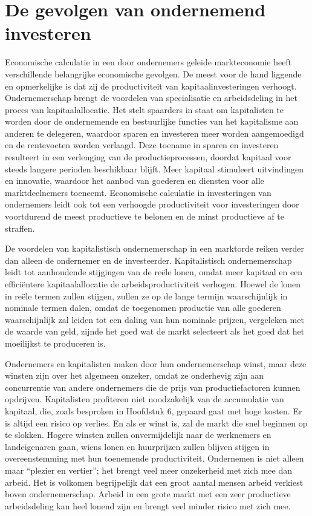 \hypertarget{de-gevolgen-van-ondernemend-investeren}{%
\section{De gevolgen van ondernemend investeren}\label{de-gevolgen-van-ondernemend-investeren}}

Economische calculatie in een door ondernemers geleide markteconomie heeft verschillende belangrijke economische gevolgen. De meest voor de hand liggende en opmerkelijke is dat zij de productiviteit van kapitaalinvesteringen verhoogt. Ondernemerschap brengt de voordelen van specialisatie en arbeidsdeling in het proces van kapitaalallocatie. Het stelt spaarders in staat om kapitalisten te worden door de ondernemende en bestuurlijke functies van het kapitalisme aan anderen te delegeren, waardoor sparen en investeren meer worden aangemoedigd en de rentevoeten worden verlaagd. Deze toename in sparen en investeren resulteert in een verlenging van de productieprocessen, doordat kapitaal voor steeds langere perioden beschikbaar blijft. Meer kapitaal stimuleert uitvindingen en innovatie, waardoor het aanbod van goederen en diensten voor alle marktdeelnemers toeneemt. Economische calculatie in investeringen van ondernemers leidt ook tot een verhoogde productiviteit voor investeringen door voortdurend de meest productieve te belonen en de minst productieve af te straffen.

De voordelen van kapitalistisch ondernemerschap in een marktorde reiken verder dan alleen de ondernemer en de investeerder. Kapitalistisch ondernemerschap leidt tot aanhoudende stijgingen van de reële lonen, omdat meer kapitaal en een efficiëntere kapitaalallocatie de arbeidsproductiviteit verhogen. Hoewel de lonen in reële termen zullen stijgen, zullen ze op de lange termijn waarschijnlijk in nominale termen dalen, omdat de toegenomen productie van alle goederen waarschijnlijk zal leiden tot een daling van hun nominale prijzen, vergeleken met de waarde van geld, zijnde het goed wat de markt selecteert als het goed dat het moeilijkst te produceren is.

Ondernemers en kapitalisten maken door hun ondernemerschap winst, maar deze winsten zijn over het algemeen onzeker, omdat ze onderhevig zijn aan concurrentie van andere ondernemers die de prijs van productiefactoren kunnen opdrijven. Kapitalisten profiteren niet noodzakelijk van de accumulatie van kapitaal, die, zoals besproken in Hoofdstuk 6, gepaard gaat met hoge kosten. Er is altijd een risico op verlies. En als er winst is, zal de markt die snel beginnen op te slokken. Hogere winsten zullen onvermijdelijk naar de werknemers en landeigenaren gaan, wiens lonen en huurprijzen zullen blijven stijgen in overeenstemming met hun toenemende productiviteit. Ondernemen is niet alleen maar ``plezier en vertier''; het brengt veel meer onzekerheid met zich mee dan arbeid. Het is volkomen begrijpelijk dat een groot aantal mensen arbeid verkiest boven ondernemerschap. Arbeid in een grote markt met een zeer productieve arbeidsdeling kan heel lonend zijn en brengt veel minder risico met zich mee.

